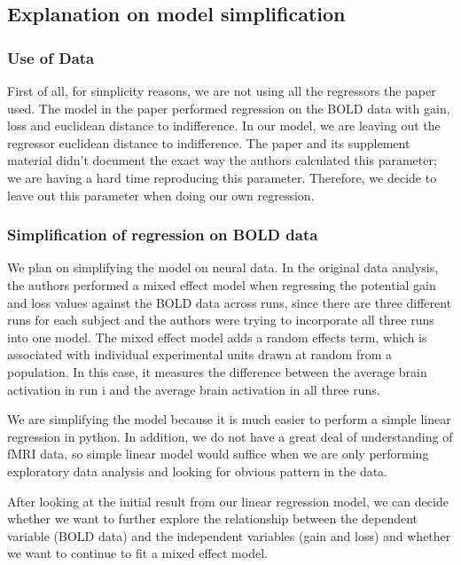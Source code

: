 \subsection{Explanation on model simplification}

\subsubsection{Use of Data}
\indent \indent First of all, for simplicity reasons, we are not using all the 
regressors the paper used. The model in the paper performed regression on the 
BOLD data with gain, loss and euclidean distance to indifference. In our model,
we are leaving out the regressor euclidean distance to indifference. The paper 
and its supplement material didn't document the exact way the authors 
calculated this parameter; we are having a hard time reproducing this 
parameter. Therefore, we decide to leave out this parameter when doing our own 
regression.

\subsubsection{Simplification of regression on BOLD data}

\indent \indent We plan on simplifying the model on neural data. In the 
original data analysis, the authors performed a mixed effect model when 
regressing the potential gain and loss values against the BOLD data across 
runs, since there are three different runs for each subject and the authors 
were trying to incorporate all three runs into one model. The mixed effect 
model adds a random effects term, which is associated with individual 
experimental units drawn at random from a population. In this case, it 
measures the difference between the average brain activation in run i and the 
average brain activation in all three runs.

We are simplifying the model because it is much easier to perform a simple 
linear regression in python. In addition, we do not have a great deal of 
understanding of fMRI data, so simple linear model would suffice when we are 
only performing exploratory data analysis and looking for obvious pattern in 
the data.

After looking at the initial result from our linear regression model, we can 
decide whether we want to further explore the relationship between the 
dependent variable (BOLD data) and the independent variables (gain and loss) 
and whether we want to continue to fit a mixed effect model.

